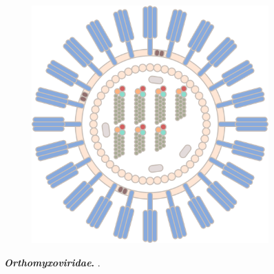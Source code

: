 \begin{figure}
\begin{adjustbox}{minipage=\dimexpr{}\fboxrule,fbox}
\begin{subfigure}[b]{0.475\textwidth}
            \includegraphics[width=\textwidth]{Graphics/Influenza_B.pdf}
        \end{subfigure}
    \end{adjustbox}
    \caption[\textit{Orthomyxoviridae}]{\textbf{\textit{Orthomyxoviridae}.} .}
    \label{fig:Orthomyxoviridae}
\end{figure}

\blindtext

